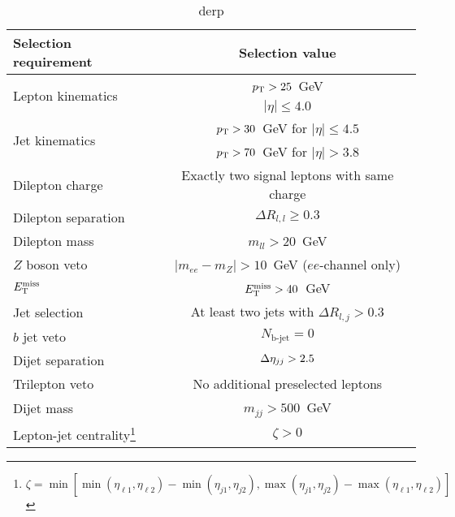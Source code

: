 
\begin{table}[htb]
  \centering
  \begin{tabular}{l|c}
    Selection requirement              & Selection value \\
    \hline\hline
    \multirow{2}{*}{Lepton kinematics} & $p_{\mathrm{T}} > 25$~GeV \\
                                       & $|\eta| \le 4.0$ \\
    \multirow{2}{*}{Jet kinematics}    & $p_{\mathrm{T}} > 30$~GeV for $|\eta| \le 4.5$ \\
                                       & $p_{\mathrm{T}} > 70$~GeV for $|\eta| > 3.8$ \\
    \hline
    Dilepton charge                    & Exactly two signal leptons with same charge\\
    Dilepton separation                & $\Delta R_{l,l} \ge 0.3$ \\
    Dilepton mass                      & $m_{ll} > 20$~GeV\\
    $Z$ boson veto                     & $|m_{ee} - m_Z| > 10$~GeV ($ee$-channel only) \\
    $E_{\mathrm{T}}^{\mathrm{miss}}$                             & $E_{\mathrm{T}}^{\mathrm{miss}} > 40$~GeV \\
    Jet selection                      & At least two jets with $\Delta R_{l,j} > 0.3$\\
    $b$ jet veto                       & $N_{\textrm{b-jet}} = 0$\\
    Dijet separation                   & $\detajj > 2.5$\\
    Trilepton veto                     & No additional preselected leptons\\
    Dijet mass                         & $m_{jj} > 500$~GeV\\
    Lepton-jet centrality\footnote{$\zeta = \min [\min (\eta_{\ell1}, \eta_{\ell2} )-\min(\eta_{j1},\eta_{j2}), \max(\eta_{j1},\eta_{j2})-\max(\eta_{\ell1},\eta_{\ell2}) ]$}                                    & $\zeta > 0$\\
    \hline
  \end{tabular}
  \caption{derp}
  \label{tab:sswwupgrade_event_selection}
\end{table}
